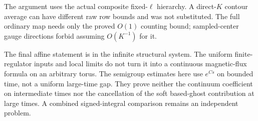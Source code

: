 The argument uses the actual composite fixed-\(\ell\)
hierarchy. A direct-\(K\) contour average can have
different raw row bounds and was not substituted.
The full ordinary map needs only the proved
\(O(1)\) counting bound; sampled-center gauge
directions forbid assuming \(O(K^{-1})\) for it.

The final affine statement is in the infinite
structural system. The uniform finite-regulator
inputs and local limits do not turn it into a
continuous magnetic-flux formula on an arbitrary
torus. The semigroup estimates here use \(e^{Cs}\)
on bounded time, not a uniform large-time gap.
They prove neither the continuum coefficient on
intermediate times nor the cancellation of the
soft based-ghost contribution at large times.
A combined signed-integral comparison remains
an independent problem.

